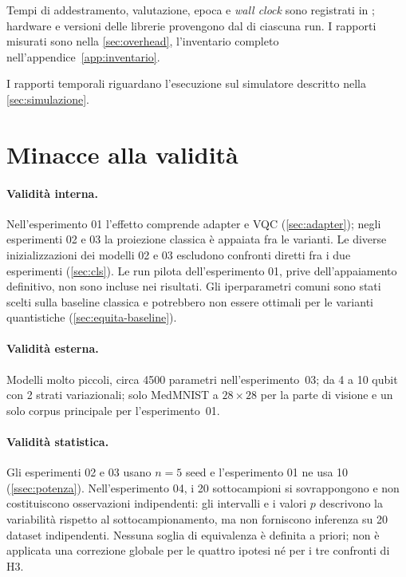 Tempi di addestramento, valutazione, epoca e \emph{wall clock} sono registrati in
; hardware e versioni delle librerie provengono dal
 di ciascuna run. I rapporti misurati sono nella
\cref{sec:overhead}, l'inventario completo nell'appendice~\ref{app:inventario}.

I rapporti temporali riguardano l'esecuzione sul simulatore descritto nella
\cref{sec:simulazione}.

\section{Minacce alla validità}
\label{sec:minacce}

\paragraph{Validità interna.} Nell'esperimento 01 l'effetto comprende adapter e
VQC (\cref{sec:adapter}); negli esperimenti 02 e 03 la proiezione classica è
appaiata fra le varianti. Le diverse inizializzazioni dei modelli 02 e 03
escludono confronti diretti fra i due esperimenti (\cref{sec:cls}). Le run pilota
dell'esperimento 01, prive dell'appaiamento definitivo, non sono incluse nei
risultati. Gli iperparametri comuni sono stati scelti sulla baseline classica e
potrebbero non essere ottimali per le varianti quantistiche
(\cref{sec:equita-baseline}).

\paragraph{Validità esterna.} Modelli molto piccoli, circa \num{4500} parametri
nell'esperimento~03; da 4 a 10 qubit con 2 strati variazionali; solo MedMNIST a
$28\times28$ per la parte di visione e un solo corpus principale per
l'esperimento~01.

\paragraph{Validità statistica.} Gli esperimenti 02 e 03 usano $n = 5$ seed e
l'esperimento 01 ne usa 10 (\cref{ssec:potenza}). Nell'esperimento 04, i 20
sottocampioni si sovrappongono e non costituiscono osservazioni indipendenti: gli
intervalli e i valori $p$ descrivono la variabilità rispetto al sottocampionamento,
ma non forniscono inferenza su 20 dataset indipendenti. Nessuna soglia di
equivalenza è definita a priori; non è applicata una correzione globale per le
quattro ipotesi né per i tre confronti di H3.

